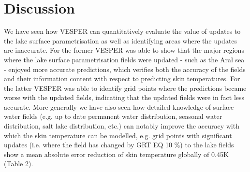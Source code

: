 \documentclass[hess, manuscript]{copernicus}
\begin{document}
\section{Discussion}
We have seen how VESPER can quantitatively evaluate the value of updates to the lake surface parametrisation as well as identifying areas where the updates are inaccurate. For the former VESPER was able to show that the major regions where the lake surface parametrisation fields were updated - such as the Aral sea - enjoyed more accurate predictions, which verifies both the accuracy of the fields and their information content with respect to predicting skin temperatures. For the latter VESPER was able to identify grid points where the predictions became worse with the updated fields, indicating that the updated fields were in fact less accurate. More generally we have also seen how detailed knowledge of surface water fields (e.g. up to date permanent water distribution, seasonal water distribution, salt lake distribution, etc.) can notably improve the accuracy with which the skin temperature can be modelled, e.g. grid points with significant updates (i.e. where the field has changed by GRT EQ 10 \%) to the lake fields show a mean absolute error reduction of skin temperature globally of 0.45K (Table 2).
\end{document}
